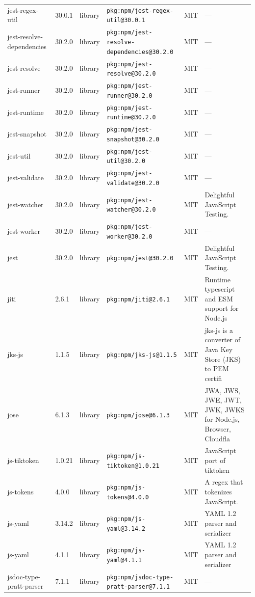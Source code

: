 \documentclass[11pt]{article}
\begin{document}
\begin{longtable}{|l|l|l|p{2.2cm}|l|p{4cm}|}
jest-regex-util & 30.0.1 & library & \texttt{pkg:npm/jest-regex-util@30.0.1} & MIT & — \\
jest-resolve-dependencies & 30.2.0 & library & \texttt{pkg:npm/jest-resolve-dependencies@30.2.0} & MIT & — \\
jest-resolve & 30.2.0 & library & \texttt{pkg:npm/jest-resolve@30.2.0} & MIT & — \\
jest-runner & 30.2.0 & library & \texttt{pkg:npm/jest-runner@30.2.0} & MIT & — \\
jest-runtime & 30.2.0 & library & \texttt{pkg:npm/jest-runtime@30.2.0} & MIT & — \\
jest-snapshot & 30.2.0 & library & \texttt{pkg:npm/jest-snapshot@30.2.0} & MIT & — \\
jest-util & 30.2.0 & library & \texttt{pkg:npm/jest-util@30.2.0} & MIT & — \\
jest-validate & 30.2.0 & library & \texttt{pkg:npm/jest-validate@30.2.0} & MIT & — \\
jest-watcher & 30.2.0 & library & \texttt{pkg:npm/jest-watcher@30.2.0} & MIT & Delightful JavaScript Testing. \\
jest-worker & 30.2.0 & library & \texttt{pkg:npm/jest-worker@30.2.0} & MIT & — \\
jest & 30.2.0 & library & \texttt{pkg:npm/jest@30.2.0} & MIT & Delightful JavaScript Testing. \\
jiti & 2.6.1 & library & \texttt{pkg:npm/jiti@2.6.1} & MIT & Runtime typescript and ESM support for Node.js \\
jks-js & 1.1.5 & library & \texttt{pkg:npm/jks-js@1.1.5} & MIT & jks-js is a converter of Java Key Store (JKS) to PEM certifi \\
jose & 6.1.3 & library & \texttt{pkg:npm/jose@6.1.3} & MIT & JWA, JWS, JWE, JWT, JWK, JWKS for Node.js, Browser, Cloudfla \\
js-tiktoken & 1.0.21 & library & \texttt{pkg:npm/js-tiktoken@1.0.21} & MIT & JavaScript port of tiktoken \\
js-tokens & 4.0.0 & library & \texttt{pkg:npm/js-tokens@4.0.0} & MIT & A regex that tokenizes JavaScript. \\
js-yaml & 3.14.2 & library & \texttt{pkg:npm/js-yaml@3.14.2} & MIT & YAML 1.2 parser and serializer \\
js-yaml & 4.1.1 & library & \texttt{pkg:npm/js-yaml@4.1.1} & MIT & YAML 1.2 parser and serializer \\
jsdoc-type-pratt-parser & 7.1.1 & library & \texttt{pkg:npm/jsdoc-type-pratt-parser@7.1.1} & MIT & — \\

\end{longtable}
\end{document}
